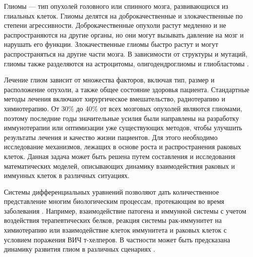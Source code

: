 \documentclass[14pt,a4paper]{extarticle}
\begin{document}
	\begin{introduction}
	
	Глиомы --- тип опухолей головного или спинного мозга, развивающихся из глиальных клеток. Глиомы делятся на доброкачественные и злокачественные по степени агрессивности.  Доброкачественные опухоли растут медленно и не распространяются на другие органы, но они могут вызывать давление на мозг и нарушать его функции. Злокачественные глиомы быстро растут и могут распространяться на другие части мозга. В зависимости от структуры и мутаций, глиомы также разделяются на астроцитомы, олигодендроглиомы и глиобластомы \cite{glioma_classification}.
	
	Лечение глиом зависит от множества факторов, включая тип, размер и расположение опухоли, а также общее состояние здоровья пациента. Стандартные методы лечения включают хирургическое вмешательство, радиотерапию и химиотерапию. От 30\% до 40\% от всех мозговых опухолей \cite{glioma_overview} являются глиомами, поэтому последние годы значительные усилия были направлены на разработку иммунотерапии или оптимизации уже существующих методов, чтобы улучшить результаты лечения и качество жизни пациентов. Для этого необходимо исследование механизмов, лежащих в основе роста и распространения раковых клеток. Данная задача может быть решена путем составления и исследования математических моделей, описывающих динамику взаимодействия раковых и иммунных клеток в различных ситуациях. 
	
	Системы дифференциальных уравнений позволяют дать количественное представление многим биологическим процессам, протекающим во время заболевания \cite{abt_DEs}. Например, взаимодействие патогена и иммунной системы с учетом воздействия терапевтических белков\cite{Kasbawati et.al.}, реакция системы рак-иммунитет на химиотерапию\cite{W. L. Duan et.al.,Xiangdong Liu et.al.,L.G. de Pillis et.al., dePillis L.G. et.al.} или взаимодействие клеток иммунитета и раковых клеток с условием поражения ВИЧ т-хелперов\cite{F. A. Rihan et.al.}. В частности может быть предсказана динамику развития глиом в различных сценариях \cite{gliomae_scenarios}.
	

\end{introduction}
\end{document}
